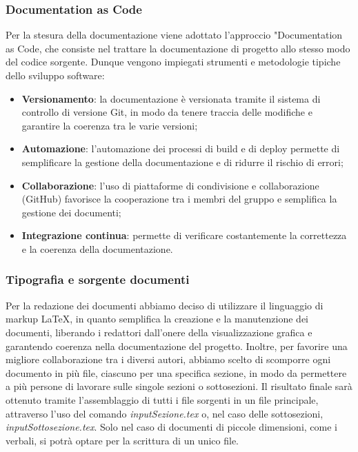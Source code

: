 \subsubsection{Documentation as Code}
Per la stesura della documentazione viene adottato l'approccio "Documentation as Code, che consiste nel trattare la documentazione di progetto
allo stesso modo del codice sorgente. Dunque vengono impiegati strumenti e metodologie tipiche dello sviluppo software:
\begin{itemize}
	\item \textbf{Versionamento}: la documentazione è versionata tramite il sistema di controllo di versione Git, in modo da tenere traccia
	      delle modifiche e garantire la coerenza tra le varie versioni;
	\item \textbf{Automazione}: l'automazione dei processi di build e di deploy permette di semplificare la gestione della documentazione e
	      di ridurre il rischio di errori;
	\item \textbf{Collaborazione}: l'uso di piattaforme di condivisione e collaborazione (GitHub) favorisce la cooperazione tra i membri
	      del gruppo e semplifica la gestione dei documenti;
	\item \textbf{Integrazione continua}: permette di verificare costantemente la correttezza e la coerenza della documentazione.
\end{itemize}

\subsubsection{Tipografia e sorgente documenti}
Per la redazione dei documenti abbiamo deciso di utilizzare il linguaggio di markup \LaTeX{}, in quanto semplifica la creazione e la manutenzione
dei documenti, liberando i redattori dall'onere della visualizzazione grafica e garantendo coerenza nella documentazione del progetto.
Inoltre, per favorire una migliore collaborazione tra i diversi autori, abbiamo scelto di scomporre ogni documento in più file,
ciascuno per una specifica sezione, in modo da permettere a più persone di lavorare sulle singole sezioni o sottosezioni.
Il risultato finale sarà ottenuto tramite l'assemblaggio di tutti i file sorgenti in un file principale, attraverso l'uso del comando
\textit{input{Sezione.tex}} o, nel caso delle sottosezioni, \textit{input{Sottosezione.tex}}.
Solo nel caso di documenti di piccole dimensioni, come i verbali, si potrà optare per la scrittura di un unico file.

